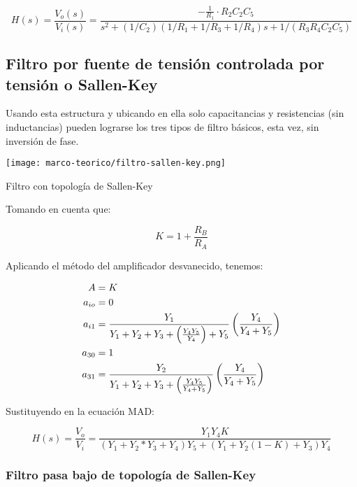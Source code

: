 \begin{equation}[ht]
    H(s) = \frac{V_o(s)}{V_i(s)} = \frac{-\frac{1}{R_1}\cdot R_2C_2 C_5}{s^2 + (1/C_2)(1/R_1 + 1/R_3 + 1/R_4)s + 1/(R_3 R_4 C_2 C_5)}
    \label{eq:func-transferencia-pasa-bajos-multirealimentacion}
\end{equation}

\subsection{Filtro por fuente de tensión controlada por tensión o Sallen-Key}

Usando esta estructura y ubicando en ella solo capacitancias y resistencias (sin inductancias) pueden lograrse los tres tipos de filtro básicos, esta vez, sin inversión de fase.

\begin{ilustracion}[ht]
    \centering
    \texttt{[image: marco-teorico/filtro-sallen-key.png]}
    \caption{Filtro con topología de Sallen-Key}
    \label{ilus:filtro-activo-sallen-key}
\end{ilustracion}

Tomando en cuenta que:

\begin{equation}
    K = 1 + \frac{R_B}{R_A}
\end{equation}

Aplicando el método del amplificador desvanecido, tenemos:

\begin{align}
    A &= K \\
    a_{io} &= 0 \\
    a_{i1} &= \frac{Y_1}{Y_1 + Y_2 + Y_3 + \left( \frac{Y_4 Y_5}{Y_4} \right) + Y_5} \left( \frac{Y_4}{Y_4 + Y_5} \right) \\
    a_{30} &= 1 \\
    a_{31} &= \frac{Y_2}{Y_1 + Y_2 + Y_3 + \left( \frac{Y_4 Y_5}{Y_4 + Y_5} \right)} \left( \frac{Y_4}{Y_4 + Y_5} \right) \\
\end{align}

Sustituyendo en la ecuación MAD:

\begin{equation}
    H(s) = \frac{V_o}{V_i} = \frac{Y_1 Y_4 K}{(Y_1 + Y_2 * Y_3 + Y_4)Y_5 + (Y_1 +Y_2(1-K)+Y_3)Y_4}
\end{equation}

\subsubsection{Filtro pasa bajo de topología de Sallen-Key}

